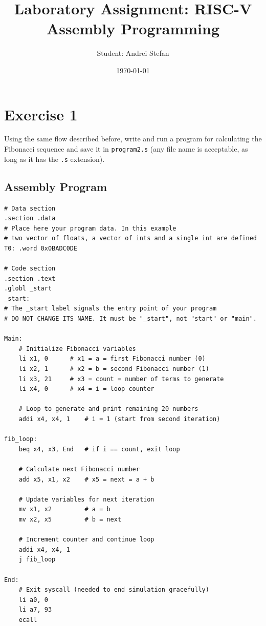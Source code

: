 \documentclass[a4paper,12pt]{article}
\begin{document}
\title{Laboratory Assignment: RISC-V Assembly Programming}
\author{Student: Andrei Stefan}
\date{\today}
\maketitle

\section*{Exercise 1}

Using the same flow described before, write and run a program for calculating the Fibonacci sequence and save it in \texttt{program2.s} (any file name is acceptable, as long as it has the \texttt{.s} extension).

\subsection*{Assembly Program}

\begin{lstlisting}[language={[x86masm]Assembler}, caption={Fibonacci sequence generator in RISC-V Assembly}]
# Data section
.section .data
# Place here your program data. In this example
# two vector of floats, a vector of ints and a single int are defined
T0: .word 0x0BADC0DE

# Code section
.section .text
.globl _start
_start:
# The _start label signals the entry point of your program
# DO NOT CHANGE ITS NAME. It must be "_start", not "start" or "main".

Main:
    # Initialize Fibonacci variables
    li x1, 0      # x1 = a = first Fibonacci number (0)
    li x2, 1      # x2 = b = second Fibonacci number (1)
    li x3, 21     # x3 = count = number of terms to generate
    li x4, 0      # x4 = i = loop counter

    # Loop to generate and print remaining 20 numbers
    addi x4, x4, 1    # i = 1 (start from second iteration)

fib_loop:
    beq x4, x3, End   # if i == count, exit loop

    # Calculate next Fibonacci number
    add x5, x1, x2    # x5 = next = a + b

    # Update variables for next iteration
    mv x1, x2         # a = b
    mv x2, x5         # b = next

    # Increment counter and continue loop
    addi x4, x4, 1
    j fib_loop

End:
    # Exit syscall (needed to end simulation gracefully)
    li a0, 0
    li a7, 93
    ecall
\end{lstlisting}
\end{document}
